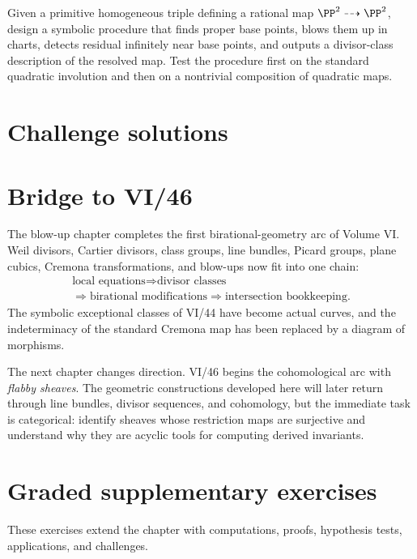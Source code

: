 \begin{problem}\label{chal:vi45-05}
Given a primitive homogeneous triple defining a rational map \(\PP^2\dashrightarrow\PP^2\), design a symbolic procedure that finds proper base points, blows them up in charts, detects residual infinitely near base points, and outputs a divisor-class description of the resolved map.  Test the procedure first on the standard quadratic involution and then on a nontrivial composition of quadratic maps.
\end{problem}

\ifdefined\IncludeChallengeSolutions
\section{Challenge solutions}

\fi

\section*{Bridge to VI/46}

The blow-up chapter completes the first birational-geometry arc of Volume VI.  Weil divisors, Cartier divisors, class groups, line bundles, Picard groups, plane cubics, Cremona transformations, and blow-ups now fit into one chain:
\[
  \begin{gathered}
  \text{local equations}\Longrightarrow\text{divisor classes}\\
  \Longrightarrow\text{birational modifications}\Longrightarrow\text{intersection bookkeeping}.
  \end{gathered}
\]
The symbolic exceptional classes of VI/44 have become actual curves, and the indeterminacy of the standard Cremona map has been replaced by a diagram of morphisms.

The next chapter changes direction.  VI/46 begins the cohomological arc with \emph{flabby sheaves}.  The geometric constructions developed here will later return through line bundles, divisor sequences, and cohomology, but the immediate task is categorical: identify sheaves whose restriction maps are surjective and understand why they are acyclic tools for computing derived invariants.
\section{Graded supplementary exercises}
These exercises extend the chapter with computations, proofs, hypothesis tests, applications, and challenges.

